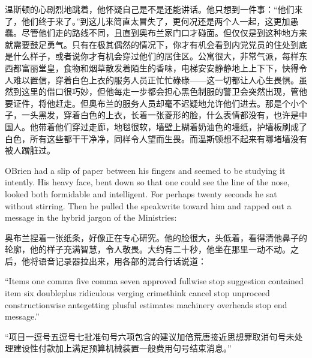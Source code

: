 \begin{paracol}{2}
\switchcolumn

温斯顿的心剧烈地跳着，他怀疑自己是不是还能讲话。他只想到一件事：``他们来了，他们终于来了。''到这儿来简直太冒失了，更何况还是两个人一起，这更加愚蠢。尽管他们走的路线不同，且直到奥布兰家门口才碰面。但仅仅是到这种地方来就需要鼓足勇气。只有在极其偶然的情况下，你才有机会看到内党党员的住处到底是什么样子，或者说你才有机会穿过他们的居住区。公寓很大，非常气派，每样东西都富丽堂皇，食物和烟草散发着陌生的香味，电梯安安静静地上上下下，快得令人难以置信，穿着白色上衣的服务人员正忙忙碌碌——这一切都让人心生畏惧。虽然到这里的借口很巧妙，但他每走一步都会担心黑色制服的警卫会突然出现，管他要证件，将他赶走。但奥布兰的服务人员却毫不迟疑地允许他们进去。那是个小个子，一头黑发，穿着白色的上衣，长着一张菱形的脸，什么表情都没有，也许是中国人。他带着他们穿过走廊，地毯很软，墙壁上糊着奶油色的墙纸，护墙板刷成了白色，所有这些都干干净净，同样令人望而生畏。而温斯顿想不起来有哪堵墙没有被人蹭脏过。

\switchcolumn*

O\textquotesingle Brien had a slip of paper between his fingers and
seemed to be studying it intently. His heavy face, bent down so that one
could see the line of the nose, looked both formidable and intelligent.
For perhaps twenty seconds he sat without stirring. Then he pulled the
speakwrite toward him and rapped out a message in the hybrid jargon of
the Ministries:

\switchcolumn

奥布兰捏着一张纸条，好像正在专心研究。他的脸很大，头低着，看得清他鼻子的轮廓，他的样子充满智慧，令人敬畏。大约有二十秒，他坐在那里一动不动。之后，他将语音记录器拉出来，用各部的混合行话说道：

\switchcolumn*

``Items one comma five comma seven approved fullwise stop suggestion
contained item six doubleplus ridiculous verging crimethink cancel stop
unproceed constructionwise antegetting plusful estimates machinery
overheads stop end message.''

\switchcolumn

``项目一逗号五逗号七批准句号六项包含的建议加倍荒唐接近思想罪取消句号未处理建设性付款加上满足预算机械装置一般费用句号结束消息。''

\switchcolumn*


\end{paracol}
